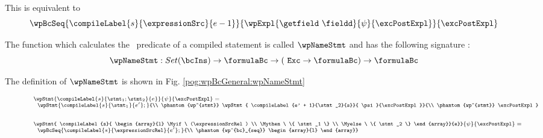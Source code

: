 This is equivalent to 
  $$\wpBcSeq{\compileLabel{s}{\expressionSrc}{e - 1}}{\wpExpl{\getfield \ \fieldd }{\psi}{\excPostExpl} }{\excPostExpl} $$  




The function which calculates the \wpName \ predicate of a compiled statement is called $\wpNameStmt$ and has the following signature :
$$\wpNameStmt : Set(\bcIns) \rightarrow  \formulaBc \rightarrow  ( \mbox{ \rm \texttt{Exc}}  \rightarrow \formulaBc ) \rightarrow \formulaBc$$ 

The definition of $\wpNameStmt$ is shown in Fig. \ref{pog:wpBcGeneral:wpNameStmt}
\begin{figure}[ht!]
\begin{frameit}
$${\scriptsize 
        \begin{array}{l} 
        \wpStmt{ \compileLabel{s}{\stmt_1;\stmt_2 }{e}}{ \psi}{\excPostExpl} = \\
                  \begin{array}{l}  
	 	   \wpStmt{\compileLabel{s}{\stmt_1}{e'};}
                          {\\
                           \phantom{wp^{stmt}} \wpStmt{ \compileLabel{e' + 1}{\stmt_2}{s}}{ \psi}{\excPostExpl}}
			  {\\ 
                           \phantom{wp^{stmt}} \excPostExpl} 
          \end{array} \\
	  \\ \\
	  \wpStmt{   \compileLabel{s}{ \begin{array}{l} \Myif \ (\expressionSrcRel) \\
                                                               \Mythen \ \{ \stmt_1 \} \\  
							       \Myelse \ \{ \stmt_2 \}   
                                              \end{array}}{e}}{\psi}{\excPostExpl} = \\ 
                     \begin{array}{l} 
                        \wpBcSeq{%
                      	                    \compileLabel{s}{\expressionSrcRel}{e'}; 
			    } {\\
                             \phantom{wp^{bc}_{seq}}	 \begin{array}{l}

\end{array}}
\end{array}
\end{array}}$$
\end{frameit}
\end{figure}
